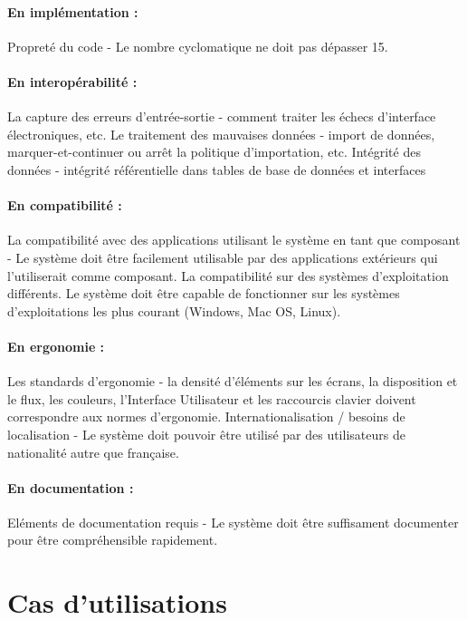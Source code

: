 \documentclass[12pt,a4paper,openany]{report}
\begin{document}
		\paragraph{En implémentation :}
		Propreté du code - Le nombre cyclomatique ne doit pas dépasser 15.
		\paragraph{En interopérabilité :}
		La capture des erreurs d'entrée-sortie - comment traiter les échecs d'interface électroniques, etc.
		Le traitement des mauvaises données - import de données, marquer-et-continuer ou arrêt la politique d'importation, etc.
		Intégrité des données - intégrité référentielle dans tables de base de données et interfaces
		\paragraph{En compatibilité :}
		La compatibilité avec des applications utilisant le système en tant que composant - Le système doit être facilement
		utilisable par des applications extérieurs qui l'utiliserait comme composant.
		La compatibilité sur des systèmes d'exploitation différents. Le système doit être capable de fonctionner sur les 
		systèmes d'exploitations les plus courant (Windows, Mac OS, Linux).
		\paragraph{En ergonomie :}
		Les standards d'ergonomie - la densité d'éléments sur les écrans, la disposition et le flux, les couleurs, l'Interface 
		Utilisateur et les raccourcis clavier doivent correspondre aux normes d'ergonomie.
		Internationalisation / besoins de localisation - Le système doit pouvoir être utilisé par des utilisateurs de nationalité autre que française.
		\paragraph{En documentation :}
		Eléments de documentation requis - Le système doit être suffisament documenter pour être compréhensible rapidement.
	\section{Cas d'utilisations}
\end{document}
